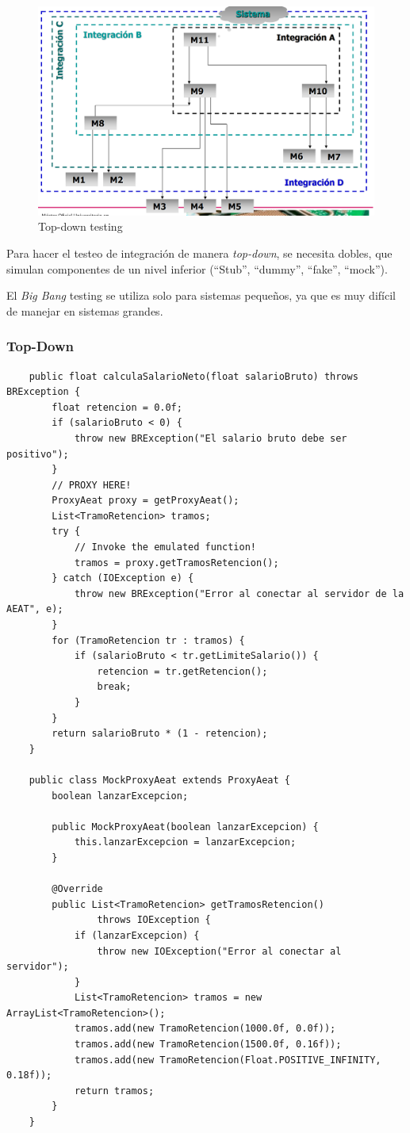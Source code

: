 \begin{figure}[htbp]
	\centering
	\includegraphics{images/03/topdown.png}
	\caption{Top-down testing}
	\label{fig:03/topdown}
\end{figure}

Para hacer el testeo de integración de manera \textit{top-down}, se
necesita dobles, que simulan componentes de un nivel inferior (``Stub'', ``dummy'', ``fake'', ``mock'').
\ns

El \textit{Big Bang} testing se utiliza solo para sistemas pequeños, ya que es muy difícil de manejar en sistemas grandes.


\subsubsection{Top-Down}
\begin{lstlisting}
	public float calculaSalarioNeto(float salarioBruto) throws BRException {
		float retencion = 0.0f;
		if (salarioBruto < 0) {
			throw new BRException("El salario bruto debe ser positivo");
		}
		// PROXY HERE!
		ProxyAeat proxy = getProxyAeat();
		List<TramoRetencion> tramos;
		try {
			// Invoke the emulated function!
			tramos = proxy.getTramosRetencion();
		} catch (IOException e) {
			throw new BRException("Error al conectar al servidor de la AEAT", e);
		}
		for (TramoRetencion tr : tramos) {
			if (salarioBruto < tr.getLimiteSalario()) {
				retencion = tr.getRetencion();
				break;
			}
		}
		return salarioBruto * (1 - retencion);
	}
	
	public class MockProxyAeat extends ProxyAeat {
		boolean lanzarExcepcion;
	
		public MockProxyAeat(boolean lanzarExcepcion) {
			this.lanzarExcepcion = lanzarExcepcion;
		}
	
		@Override
		public List<TramoRetencion> getTramosRetencion()
				throws IOException {
			if (lanzarExcepcion) {
				throw new IOException("Error al conectar al servidor");
			}
			List<TramoRetencion> tramos = new ArrayList<TramoRetencion>();
			tramos.add(new TramoRetencion(1000.0f, 0.0f));
			tramos.add(new TramoRetencion(1500.0f, 0.16f));
			tramos.add(new TramoRetencion(Float.POSITIVE_INFINITY, 0.18f));
			return tramos;
		}
	}
\end{lstlisting}

